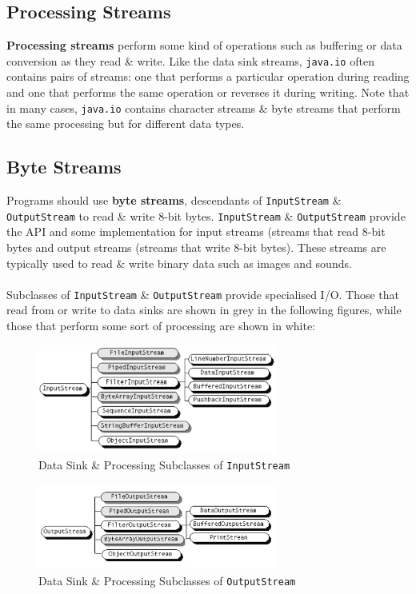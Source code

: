 \documentclass[a4paper,11pt]{article}
\begin{document}
\subsection{Processing Streams}
\textbf{Processing streams} perform some kind of operations such as buffering or data conversion as they read \& 
write. 
Like the data sink streams, \verb|java.io| often contains pairs of streams: one that performs a particular 
operation during reading and one that performs the same operation or reverses it during writing.
Note that in many cases, \verb|java.io| contains character streams \& byte streams that perform the same 
processing but for different data types.

\subsection{Byte Streams}
Programs should use \textbf{byte streams}, descendants of \verb|InputStream| \& \verb|OutputStream| to read \& 
write 8-bit bytes.
\verb|InputStream| \& \verb|OutputStream| provide the API and some implementation for input streams (streams that 
read 8-bit bytes and output streams (streams that write 8-bit bytes).
These streams are typically used to read \& write binary data such as images and sounds.
\\\\ 
Subclasses of \verb|InputStream| \& \verb|OutputStream| provide specialised I/O. 
Those that read from or write to data sinks are shown in grey in the following figures, while those that 
perform some sort of processing are shown in white:
\begin{figure}[H]
    \centering
    \includegraphics[width=0.7\textwidth]{./images/InputStream.png}
    \caption{Data Sink \& Processing Subclasses of \texttt{InputStream}}
\end{figure}
\begin{figure}[H]
    \centering
    \includegraphics[width=0.7\textwidth]{./images/OutputStream.png}
    \caption{Data Sink \& Processing Subclasses of \texttt{OutputStream}}
\end{figure}
\end{document}
